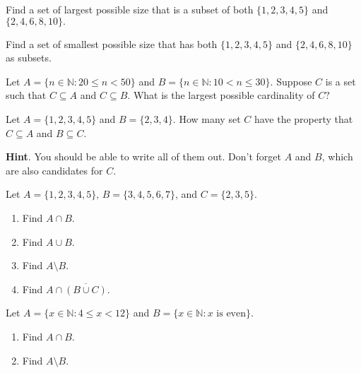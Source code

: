 \documentclass[11pt,]{book}
\theoremstyle{ptxplainnotitle}
\theoremstyle{ptxplaintitle}
\theoremstyle{ptxdefinitionnotitle}
\theoremstyle{ptxdefinitiontitle}
\theoremstyle{ptxdefinitionnotitle}
\theoremstyle{ptxdefinitiontitle}
\theoremstyle{ptxdefinitionnotitle}
\theoremstyle{ptxdefinitiontitle}
\theoremstyle{ptxdefinitiontitlenonumber}
\theoremstyle{ptxdefinitiontitlenonumber}
\numberwithin{equation}{chapter}
\newcommand{\N}{\mathbb N}
\newcommand{\st}{:}
\newcommand{\lt}{<}
\begin{document}
\begin{divisionexercise}{4}\hypertarget{exercise-82}{}
\hypertarget{p-850}{}%
Find a set of largest possible size that is a subset of both \(\{1, 2, 3, 4, 5\}\) and \(\{2, 4, 6, 8,10\}\text{.}\)%
\end{divisionexercise}%
\begin{divisionexercise}{5}\hypertarget{exercise-83}{}
\hypertarget{p-856}{}%
Find a set of smallest possible size that has both \(\{1,2,3,4,5\}\) and \(\{2,4,6,8,10\}\) as subsets.%
\end{divisionexercise}%
\begin{divisionexercise}{6}\hypertarget{exercise-84}{}
\hypertarget{p-861}{}%
Let \(A = \{n \in \N \st 20 \le n \lt 50\}\) and \(B = \{n \in \N \st 10 \lt n \le 30\}\text{.}\) Suppose \(C\) is a set such that \(C \subseteq A\) and \(C \subseteq B\text{.}\)  What is the largest possible cardinality of \(C\text{?}\)%
\end{divisionexercise}%
\begin{divisionexercise}{7}\hypertarget{exercise-85}{}
\hypertarget{p-867}{}%
Let \(A = \{1,2,3,4,5\}\) and \(B = \{2, 3, 4\}\text{.}\)  How many set \(C\) have the property that \(C \subseteq A\) and \(B \subseteq C\text{.}\)%
\par\smallskip%
\noindent\textbf{Hint}.\hypertarget{hint-7}{}\quad%
\hypertarget{p-869}{}%
You should be able to write all of them out.  Don't forget \(A\) and \(B\text{,}\) which are also candidates for \(C\text{.}\)%
\end{divisionexercise}%
\begin{divisionexercise}{8}\hypertarget{exercise-86}{}
\hypertarget{p-881}{}%
Let \(A = \{1,2,3,4,5\}\text{,}\) \(B = \{3,4,5,6,7\}\text{,}\) and \(C = \{2,3,5\}\text{.}\) \leavevmode%
\begin{enumerate}[label=(\alph*)]
\item\hypertarget{li-385}{}\hypertarget{p-882}{}%
Find \(A \cap B\text{.}\)%
\item\hypertarget{li-386}{}\hypertarget{p-884}{}%
Find \(A \cup B\text{.}\)%
\item\hypertarget{li-387}{}\hypertarget{p-886}{}%
Find \(A \setminus B\text{.}\)%
\item\hypertarget{li-388}{}\hypertarget{p-888}{}%
Find \(A \cap \overline{(B \cup C)}\text{.}\)%
\end{enumerate}
%
\end{divisionexercise}%
\begin{divisionexercise}{9}\hypertarget{exercise-87}{}
\hypertarget{p-904}{}%
Let \(A = \{x \in \N \st 4 \le x \lt 12\}\) and \(B = \{x \in \N \st x \text{ is even}\}\text{.}\) \leavevmode%
\begin{enumerate}[label=(\alph*)]
\item\hypertarget{li-397}{}\hypertarget{p-905}{}%
Find \(A \cap B\text{.}\)%
\item\hypertarget{li-398}{}\hypertarget{p-907}{}%
Find \(A \setminus B\text{.}\)%
\end{enumerate}
%
\end{divisionexercise}%
\end{document}
